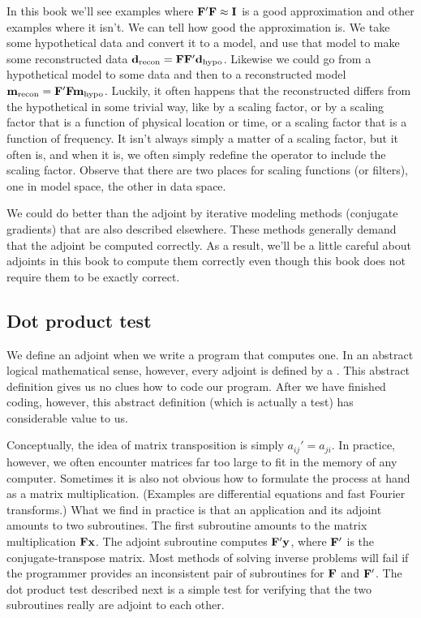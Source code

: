 \par
In this book we'll see examples where
$\bold F'\bold F\approx \bold I$
is a good approximation and other examples where it isn't.
We can tell how good the approximation is.
We take some hypothetical data and convert it to a model,
and use that model to make some reconstructed data
$\bold d_{\rm recon} = \bold F \bold F' \bold d_{\rm hypo}$.
Likewise we could go from a hypothetical model to some data and then
to a reconstructed model
$\bold m_{\rm recon} = \bold F' \bold F \bold m_{\rm hypo}$.
Luckily, it often happens that the reconstructed differs from
the hypothetical in some trivial way,
like by a scaling factor, or by a scaling factor
that is a function of physical location or time,
or a scaling factor that is a function of frequency.
It isn't always simply a matter of a scaling factor,
but it often is, and when it is, we often simply
redefine the operator to include the scaling factor.
Observe that there are two places for scaling functions (or filters),
one in model space, the other in data space.

\par
We could do better than the adjoint
by iterative modeling methods (conjugate gradients)
that are also described elsewhere.
These methods generally demand that the adjoint be computed correctly.
As a result, we'll be a little careful about adjoints in
this book to compute them correctly
even though this book does not require them to be exactly correct.

\subsection{Dot product test}

\par
We define an adjoint when we write a program that computes one.
In an abstract logical mathematical sense, however,
every adjoint is defined by a .
This abstract definition gives us no clues how to code our program.
After we have finished coding, however, this abstract definition
(which is actually a test) has considerable value to us.


\par
Conceptually, the idea of matrix transposition is simply ${a}_{ij}'=a_{ji}$.
In practice, however, we often encounter matrices far too large
to fit in the memory of any computer.
Sometimes it is also not obvious how to formulate the process at hand
as a matrix multiplication.
(Examples are differential equations and fast Fourier transforms.)
What we find in practice is that an application and its adjoint 
amounts to two subroutines. The first subroutine
amounts to the matrix multiplication $ \bold F \bold x$.
The adjoint subroutine computes $\bold F' \bold y$,
where $\bold F'$ is the conjugate-transpose matrix.
Most methods of solving inverse problems will fail
if the programmer provides an inconsistent pair of subroutines
for $\bold F$ and $\bold F'$.
The dot product test described next
is a simple test for verifying that the two 
subroutines really are adjoint to each other.

